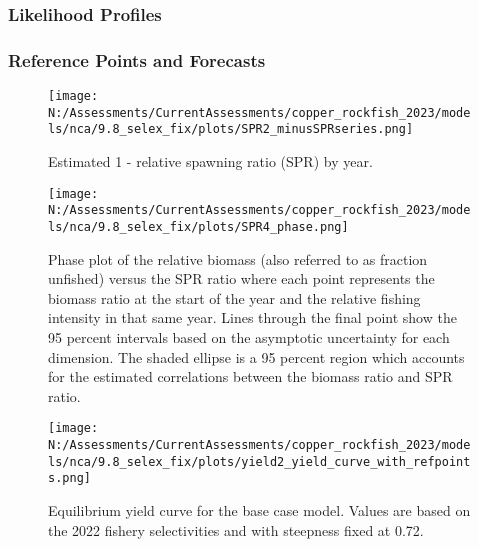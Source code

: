 \documentclass[11pt,
  english,
  letterpaper,
]{article}
\begin{document}
\pagebreak

\hypertarget{likelihood-profiles-1}{%
\subsubsection{Likelihood Profiles}\label{likelihood-profiles-1}}

\pagebreak

\hypertarget{reference-points-and-forecasts}{%
\subsubsection{Reference Points and Forecasts}\label{reference-points-and-forecasts}}

\begin{figure}
\centering
\texttt{[image: N:/Assessments/CurrentAssessments/copper\_rockfish\_2023/models/nca/9.8\_selex\_fix/plots/SPR2\_minusSPRseries.png]}
\caption{Estimated 1 - relative spawning ratio (SPR) by year.\label{fig:1-spr}}
\end{figure}

\clearpage

\begin{figure}
\centering
\texttt{[image: N:/Assessments/CurrentAssessments/copper\_rockfish\_2023/models/nca/9.8\_selex\_fix/plots/SPR4\_phase.png]}
\caption{Phase plot of the relative biomass (also referred to as fraction unfished) versus the SPR ratio where each point represents the biomass ratio at the start of the year and the relative fishing intensity in that same year. Lines through the final point show the 95 percent intervals based on the asymptotic uncertainty for each dimension. The shaded ellipse is a 95 percent region which accounts for the estimated correlations between the biomass ratio and SPR ratio.\label{fig:phase}}
\end{figure}

\pagebreak

\begin{figure}
\centering
\texttt{[image: N:/Assessments/CurrentAssessments/copper\_rockfish\_2023/models/nca/9.8\_selex\_fix/plots/yield2\_yield\_curve\_with\_refpoints.png]}
\caption{Equilibrium yield curve for the base case model. Values are based on the 2022 fishery selectivities and with steepness fixed at 0.72.\label{fig:yield}}
\end{figure}

\pagebreak
\end{document}
